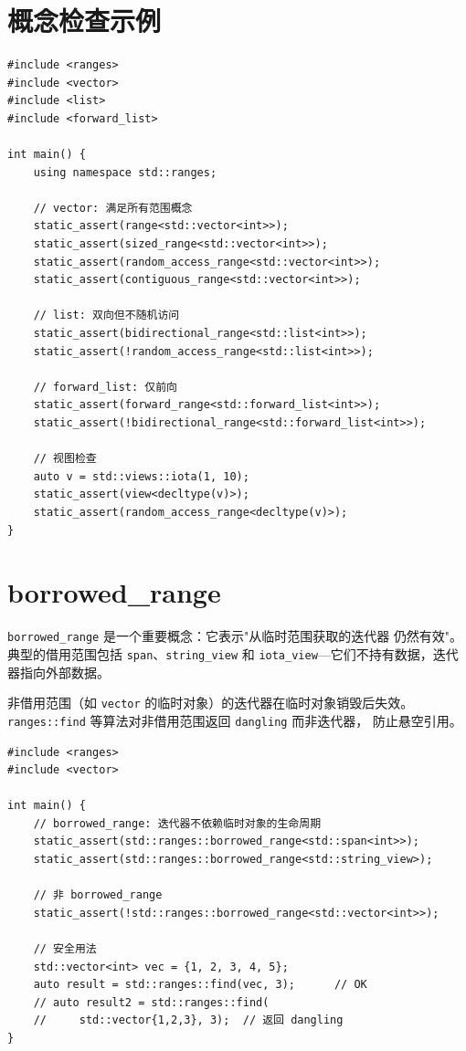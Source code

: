 \documentclass[12pt,a4paper,fontset=fandol]{ctexbook}
\begin{document}
\section{概念检查示例}

\begin{lstlisting}
#include <ranges>
#include <vector>
#include <list>
#include <forward_list>

int main() {
    using namespace std::ranges;

    // vector: 满足所有范围概念
    static_assert(range<std::vector<int>>);
    static_assert(sized_range<std::vector<int>>);
    static_assert(random_access_range<std::vector<int>>);
    static_assert(contiguous_range<std::vector<int>>);

    // list: 双向但不随机访问
    static_assert(bidirectional_range<std::list<int>>);
    static_assert(!random_access_range<std::list<int>>);

    // forward_list: 仅前向
    static_assert(forward_range<std::forward_list<int>>);
    static_assert(!bidirectional_range<std::forward_list<int>>);

    // 视图检查
    auto v = std::views::iota(1, 10);
    static_assert(view<decltype(v)>);
    static_assert(random_access_range<decltype(v)>);
}
\end{lstlisting}

\section{borrowed\_range}

\begin{note}
\texttt{borrowed\_range} 是一个重要概念：它表示"从临时范围获取的迭代器
仍然有效"。典型的借用范围包括 \texttt{span}、\texttt{string\_view} 和
\texttt{iota\_view}---它们不持有数据，迭代器指向外部数据。

非借用范围（如 \texttt{vector} 的临时对象）的迭代器在临时对象销毁后失效。
\texttt{ranges::\allowbreak{}find} 等算法对非借用范围返回 \texttt{dangling} 而非迭代器，
防止悬空引用。
\end{note}

\begin{lstlisting}
#include <ranges>
#include <vector>

int main() {
    // borrowed_range: 迭代器不依赖临时对象的生命周期
    static_assert(std::ranges::borrowed_range<std::span<int>>);
    static_assert(std::ranges::borrowed_range<std::string_view>);

    // 非 borrowed_range
    static_assert(!std::ranges::borrowed_range<std::vector<int>>);

    // 安全用法
    std::vector<int> vec = {1, 2, 3, 4, 5};
    auto result = std::ranges::find(vec, 3);      // OK
    // auto result2 = std::ranges::find(
    //     std::vector{1,2,3}, 3);  // 返回 dangling
}
\end{lstlisting}
\end{document}
